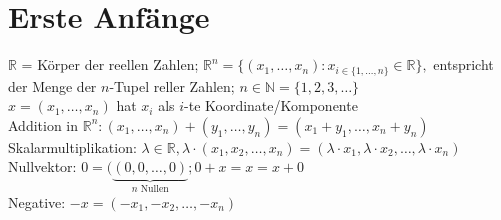 \documentclass[12pt,a4paper]{article}
\theoremstyle{plain}
\newcommand{\N}{\mathbb{N}}
\newcommand{\R}{\mathbb{R}}
\numberwithin{equation}{section}
\begin{document}
\section{Erste Anfänge}
$\R$ = Körper der reellen Zahlen; $\R^n=\{(x_1,\ldots,x_n):x_{i\in \{1,\ldots,n\}}\in \R\},$ entspricht der Menge der $n$-Tupel reller Zahlen; $ n\in \N=\{1,2,3,\ldots\}$ \\
$x=(x_1,\ldots,x_n)$ hat $x_i$ als $i$-te Koordinate/Komponente\\
Addition in $\R^n: (x_1,\ldots,x_n) + (y_1,\ldots,y_n)=(x_1+y_1,\ldots,x_n+y_n)$\\
Skalarmultiplikation: $\lambda \in \R, \lambda\cdot (x_1,x_2,\ldots,x_n)=(\lambda\cdot x_1, \lambda \cdot x_2,\ldots, \lambda\cdot x_n)$\\
Nullvektor: $0=(\underbrace{(0,0,\ldots,0)}_{n \text{ Nullen}}; 0+x=x=x+0$\\
Negative: $-x=(-x_1,-x_2,\ldots,-x_n)$
\end{document}
